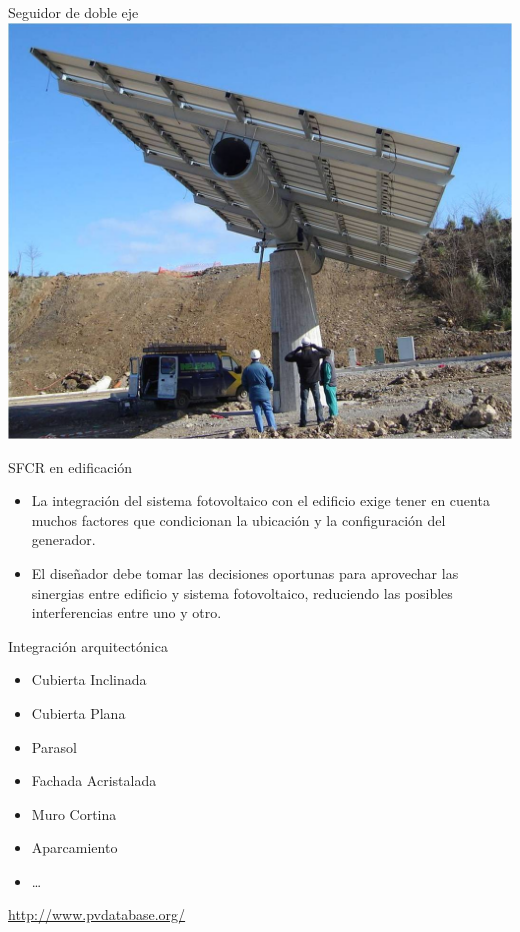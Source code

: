 \documentclass[xcolor={usenames,svgnames,dvipsnames}]{beamer}
\begin{document}
\begin{frame}[label=sec-1-3-7]{Seguidor de doble eje}
\includegraphics[width=.9\linewidth]{../figs/SeguidorReocin.jpg}
\end{frame}

\begin{frame}[label=sec-1-3-8]{SFCR en edificación}
\begin{itemize}
\item La integración del sistema fotovoltaico con el edificio exige tener en cuenta muchos factores que condicionan la ubicación y la configuración del generador.

\item El diseñador debe tomar las decisiones oportunas para \alert{aprovechar las sinergias entre edificio y sistema fotovoltaico}, reduciendo las posibles interferencias entre uno y otro.
\end{itemize}
\end{frame}

\begin{frame}[label=sec-1-3-9]{Integración arquitectónica}
\begin{itemize}
\item Cubierta Inclinada
\item Cubierta Plana
\item Parasol
\item Fachada Acristalada
\item Muro Cortina
\item Aparcamiento
\item \ldots{}
\end{itemize}

\begin{exampleblock}{}
\url{http://www.pvdatabase.org/}
\end{exampleblock}
\end{frame}
\end{document}
